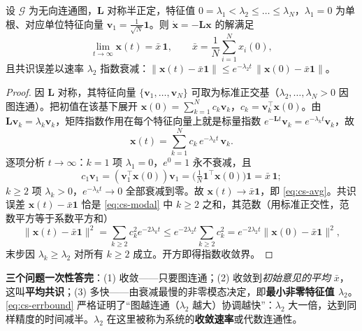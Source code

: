 \begin{theorem}[连续平均共识]\label{thm:cs-cont-conv}
设 $\mathcal{G}$ 为无向连通图，$\mathbf{L}$ 对称半正定，特征值 $0=\lambda_1<\lambda_2\le\dots\le\lambda_N$，$\lambda_1=0$ 为单根、对应单位特征向量 $\mathbf{v}_1=\tfrac{1}{\sqrt N}\mathbf{1}$。则 $\dot{\mathbf{x}}=-\mathbf{L}\mathbf{x}$ 的解满足
\begin{equation}
  \lim_{t\to\infty}\mathbf{x}(t)=\bar x\,\mathbf{1},\qquad \bar x=\frac1N\sum_{i=1}^N x_i(0),
  \label{eq:cs-avg}
\end{equation}
且共识误差以速率 $\lambda_2$ 指数衰减：$\|\mathbf{x}(t)-\bar x\mathbf{1}\|\le e^{-\lambda_2 t}\,\|\mathbf{x}(0)-\bar x\mathbf{1}\|$。
\end{theorem}

\begin{proof}
因 $\mathbf{L}$ 对称，其特征向量 $\{\mathbf{v}_1,\dots,\mathbf{v}_N\}$ 可取为标准正交基（$\lambda_2,\dots,\lambda_N>0$ 因图连通）。把初值在该基下展开 $\mathbf{x}(0)=\sum_{k=1}^N c_k\mathbf{v}_k$，$c_k=\mathbf{v}_k^\top\mathbf{x}(0)$。由 $\mathbf{L}\mathbf{v}_k=\lambda_k\mathbf{v}_k$，矩阵指数作用在每个特征向量上就是标量指数 $e^{-\mathbf{L}t}\mathbf{v}_k=e^{-\lambda_k t}\mathbf{v}_k$，故
\begin{equation}
  \mathbf{x}(t)=\sum_{k=1}^N c_k\,e^{-\lambda_k t}\,\mathbf{v}_k.
  \label{eq:cs-modal}
\end{equation}
逐项分析 $t\to\infty$：$k=1$ 项 $\lambda_1=0$，$e^{0}=1$ 永不衰减，且
\[
  c_1\mathbf{v}_1=(\mathbf{v}_1^\top\mathbf{x}(0))\mathbf{v}_1=\Big(\tfrac1N\mathbf{1}^\top\mathbf{x}(0)\Big)\mathbf{1}=\bar x\,\mathbf{1};
\]
$k\ge2$ 项 $\lambda_k>0$，$e^{-\lambda_k t}\to0$ 全部衰减到零。故 $\mathbf{x}(t)\to\bar x\mathbf{1}$，即 \cref{eq:cs-avg}。共识误差 $\mathbf{x}(t)-\bar x\mathbf{1}$ 恰是 \cref{eq:cs-modal} 中 $k\ge2$ 之和，其范数（用标准正交性，范数平方等于系数平方和）
\begin{equation}
  \|\mathbf{x}(t)-\bar x\mathbf{1}\|^2=\sum_{k\ge2}c_k^2 e^{-2\lambda_k t}\le e^{-2\lambda_2 t}\sum_{k\ge2}c_k^2=e^{-2\lambda_2 t}\|\mathbf{x}(0)-\bar x\mathbf{1}\|^2,
  \label{eq:cs-errbound}
\end{equation}
末步因 $\lambda_k\ge\lambda_2$ 对所有 $k\ge2$ 成立。开方即得指数收敛界。
\end{proof}

\textbf{三个问题一次性答完}：(1) 收敛——只要图连通；(2) 收敛到\emph{初始意见的平均} $\bar x$，这叫\textbf{平均共识}；(3) 多快——由衰减最慢的非零模态决定，即\textbf{最小非零特征值 $\lambda_2$}。\cref{eq:cs-errbound} 严格证明了“图越连通（$\lambda_2$ 越大）协调越快”：$\lambda_2$ 大一倍，达到同样精度的时间减半。$\lambda_2$ 在这里被称为系统的\textbf{收敛速率}或代数连通性。

